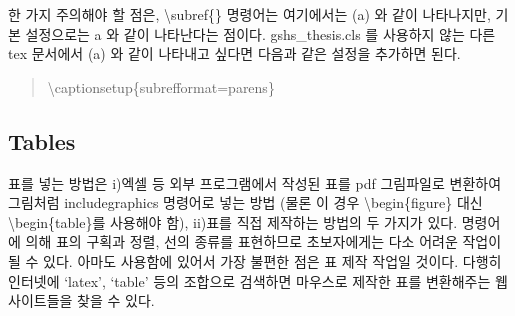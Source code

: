 \documentclass[twoside,11pt]{gshs_thesis}
\begin{document}
한 가지 주의해야 할 점은, \textbackslash subref\{\} 명령어는 여기에서는 (a) 와 같이 나타나지만, 기본 설정으로는 a 와 같이 나타난다는 점이다. gshs\_thesis.cls 를 사용하지 않는 다른 tex 문서에서 (a) 와 같이 나타내고 싶다면 다음과 같은 설정을 추가하면 된다.
\begin{quote}
	\textbackslash captionsetup\{subrefformat=parens\}
\end{quote}

\subsection{Tables}

 표를 넣는 방법은 i)엑셀 등 외부 프로그램에서 작성된 표를 pdf 그림파일로 변환하여 그림처럼 includegraphics 명령어로 넣는 방법 (물론 이 경우 {\textbackslash}begin\{figure\} 대신 {\textbackslash}begin\{table\}를 사용해야 함), ii) 표를 직접 제작하는 방법의 두 가지가 있다.  명령어에 의해 표의 구획과 정렬, 선의 종류를 표현하므로 초보자에게는 다소 어려운 작업이 될 수 있다. 아마도  사용함에 있어서 가장 불편한 점은 표 제작 작업일 것이다. 다행히 인터넷에 `latex', `table' 등의 조합으로 검색하면 마우스로 제작한 표를  변환해주는 웹사이트들을 찾을 수 있다.
\end{document}
